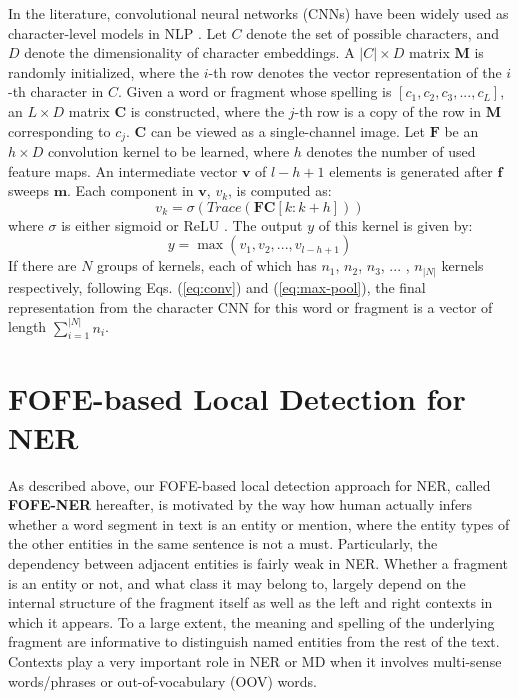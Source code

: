 \documentclass[11pt,a4paper]{article}
\begin{document}
In the literature, convolutional neural networks (CNNs) have been widely used as character-level models in NLP \cite{kim2015character}. 
Let $C$ denote the set of possible characters, and $D$ denote the dimensionality of character embeddings.
A $|C| \times D$ matrix $\bm{M}$ is randomly initialized, where the $i$-th row denotes the vector representation of the $i$-th character in $C$. Given a word or fragment whose spelling is $[c_1, c_2, c_3, ..., c_L]$, 
an $L \times D$ matrix $\bm{C}$ is constructed,  where the $j$-th row is a copy of the row in  $\bm{M}$ corresponding to $c_j$. $\bm{C}$ can be viewed as a single-channel image. 
Let $\bm{F}$ be an $h \times D$ convolution kernel to be learned,  where $h$ denotes the number of used feature maps. 
An intermediate vector $\bm{v}$ of $l-h+1$ elements is generated after $\bm{f}$ sweeps $\bm{m}$. Each component in $\bm{v}$,  $v_k$,  is computed as:
\begin{equation}
\label{eq:conv}
v_k = \sigma(Trace(\bm{F}\bm{C}[k:k+h]))
\end{equation}
where $\sigma$ is either sigmoid or ReLU \cite{glorot2011deep}.
The output  $y$ of this kernel is given by:
\begin{equation}
\label{eq:max-pool}
y = \max(v_1, v_2, ..., v_{l-h+1})
\end{equation}
If there are $N$ groups of kernels, each of which has $n_1$, $n_2$, $n_3$, ... , ${n_{|N|}}$ kernels respectively,
following Eqs. (\ref{eq:conv}) and (\ref{eq:max-pool}), the final representation from the character CNN for this word or fragment is a vector of length $\sum_{i=1}^{|N|} n_{i}$.

\section{FOFE-based Local Detection for NER}

As described above, our FOFE-based local detection approach for NER, called  \textbf{FOFE-NER} hereafter, 
is motivated by the way how human actually infers whether a word segment in text is an entity or mention, where  
the entity types of the other entities in the same sentence is not a must.
Particularly, the dependency between adjacent entities is fairly weak in NER. 
Whether a fragment is an entity or not, and what class it may belong to, largely depend on
the internal structure of the fragment itself as well as the left and right contexts  in which it appears. 
To a large extent, the meaning and spelling of the underlying fragment 
are informative to distinguish named entities from the rest of the text. 
Contexts play a very important role in NER or MD 
when it involves multi-sense words/phrases or out-of-vocabulary (OOV) words. 
\end{document}
